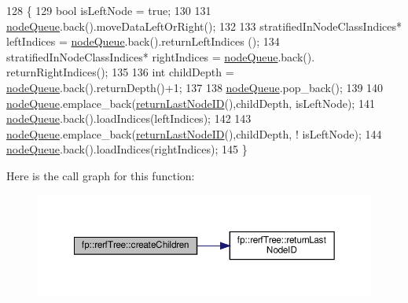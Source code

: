 \begin{DoxyCode}
128                                             \{
129                     \textcolor{keywordtype}{bool} isLeftNode = \textcolor{keyword}{true};
130 
131                     \hyperlink{classfp_1_1rerfTree_a59b3bdcba86acbe93fd46658132218a8}{nodeQueue}.back().moveDataLeftOrRight();
132 
133                     stratifiedInNodeClassIndices* leftIndices = \hyperlink{classfp_1_1rerfTree_a59b3bdcba86acbe93fd46658132218a8}{nodeQueue}.back().returnLeftIndices
      ();
134                     stratifiedInNodeClassIndices* rightIndices = \hyperlink{classfp_1_1rerfTree_a59b3bdcba86acbe93fd46658132218a8}{nodeQueue}.back().
      returnRightIndices();
135 
136                     \textcolor{keywordtype}{int} childDepth = \hyperlink{classfp_1_1rerfTree_a59b3bdcba86acbe93fd46658132218a8}{nodeQueue}.back().returnDepth()+1;
137 
138                     \hyperlink{classfp_1_1rerfTree_a59b3bdcba86acbe93fd46658132218a8}{nodeQueue}.pop\_back();
139 
140                     \hyperlink{classfp_1_1rerfTree_a59b3bdcba86acbe93fd46658132218a8}{nodeQueue}.emplace\_back(\hyperlink{classfp_1_1rerfTree_a99ed99d742ffd7f6f38487434a14b9ff}{returnLastNodeID}(),childDepth, 
      isLeftNode);
141                     \hyperlink{classfp_1_1rerfTree_a59b3bdcba86acbe93fd46658132218a8}{nodeQueue}.back().loadIndices(leftIndices);
142 
143                     \hyperlink{classfp_1_1rerfTree_a59b3bdcba86acbe93fd46658132218a8}{nodeQueue}.emplace\_back(\hyperlink{classfp_1_1rerfTree_a99ed99d742ffd7f6f38487434a14b9ff}{returnLastNodeID}(),childDepth, !
      isLeftNode);
144                     \hyperlink{classfp_1_1rerfTree_a59b3bdcba86acbe93fd46658132218a8}{nodeQueue}.back().loadIndices(rightIndices);
145                 \}
\end{DoxyCode}
Here is the call graph for this function\+:
\nopagebreak
\begin{figure}[H]
\begin{center}
\leavevmode
\includegraphics[width=350pt]{classfp_1_1rerfTree_a75ebcd9e258fdb49094e008e121bfe0a_cgraph}
\end{center}
\end{figure}
\mbox{\label{classfp_1_1rerfTree_a44f22d50d958ac20c12cf6714811e67c}} 
